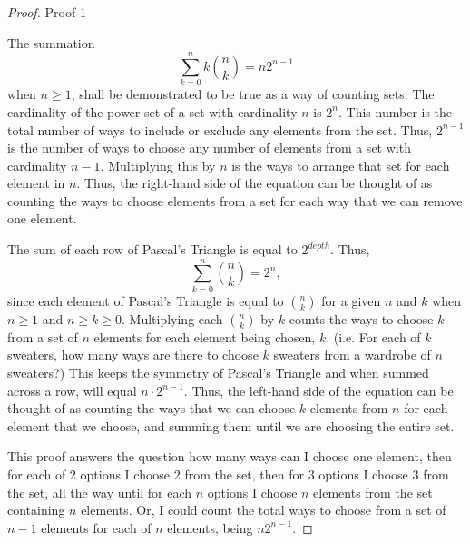\documentclass[11pt,titlepage]{article}		%
\theoremstyle{theorem}
\begin{document}
\begin{proof}
Proof 1

The summation 
    \[
        \sum\limits_{k=0}^n k \binom{n}{k} = n 2^{n-1}
    \]
when $n\ge 1$, shall be demonstrated to be true as a way of counting sets. The cardinality of the power set of a set with cardinality $n$ is $2^n$. This number is the total number of ways to include or exclude any elements from the set. Thus, $2^{n-1}$ is the number of ways to choose any number of elements from a set with cardinality $n-1$. Multiplying this by $n$ is the ways to arrange that set for each element in $n$. Thus, the right-hand side of the equation can be thought of as counting the ways to choose elements from a set for each way that we can remove one element.

The sum of each row of Pascal's Triangle is equal to $2^{depth}$. Thus, 
    \[
        \sum\limits_{k=0}^n \binom{n}{k} = 2^{n},
    \]
since each element of Pascal's Triangle is equal to $\binom{n}{k}$ for a given $n$ and $k$ when $n \ge 1$ and $n \ge k \ge 0$. Multiplying each $\binom{n}{k}$ by $k$ counts the ways to choose $k$ from a set of $n$ elements for each element being chosen, $k$. (i.e. For each of $k$ sweaters, how many ways are there to choose $k$ sweaters from a wardrobe of $n$ sweaters?)  This keeps the symmetry of Pascal's Triangle and when summed across a row, will equal $n\cdot2^{n-1}$. Thus, the left-hand side of the equation can be thought of as counting the ways that we can choose $k$ elements from $n$ for each element that we choose, and summing them until we are choosing the entire set.

This proof answers the question how many ways can I choose one element, then for each of 2 options I choose 2 from the set, then for 3 options I choose 3 from the set, all the way until for each $n$ options I choose $n$ elements from the set containing $n$ elements. Or, I could count the total ways to choose from a set of $n-1$ elements for each of $n$ elements, being $n2^{n-1}$.
\end{proof}
\clearpage
\end{document}
